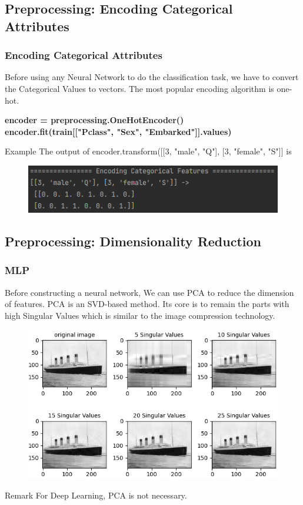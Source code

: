 \documentclass{beamer}
\begin{document}
\subsection{Preprocessing: Encoding Categorical Attributes}
\begin{frame}
	\frametitle{Encoding Categorical Attributes}
	\begin{flushleft}
		Before using any Neural Network to do the classification task, we have to convert the Categorical Values to vectors. The most popular encoding algorithm is one-hot.
	\end{flushleft}
	\begin{center}
		\textbf{\color{blue}
			encoder = preprocessing.OneHotEncoder()~~~~~~~~~~~~~~~~~~ \\
			encoder.fit(train[["Pclass", "Sex", "Embarked"]].values)
		}
	\end{center}
	\begin{block}{Example}
		The output of encoder.transform([[3, "male", "Q"], [3, "female", "S"]] is 
		\begin{center}
			\begin{figure}
		    \includegraphics[width=0.5\linewidth]{./src/figures/8.png}
		  \end{figure}
		\end{center}
	\end{block}
\end{frame}

\subsection{Preprocessing: Dimensionality Reduction}
\begin{frame}
	\frametitle{MLP}
	\begin{flushleft}
		Before constructing a neural network, We can use PCA to reduce the dimension of features. PCA is an SVD-based method. Its core is to remain the parts with high Singular Values which is similar to the image compression technology.
	\end{flushleft}
	\begin{center}
			\begin{figure}
		    \includegraphics[width=0.5\linewidth]{./src/figures/11.png}
		  \end{figure}
		\end{center}
	\begin{block}{Remark}
		For Deep Learning, PCA is not necessary.
	\end{block}
\end{frame}
\end{document}
